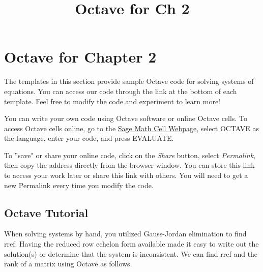 \documentclass{ximera}
\title{Octave for Ch 2} \license{CC BY-NC-SA 4.0}
\begin{document}
\begin{abstract}
\end{abstract}
\maketitle

\section*{Octave for Chapter 2}

The templates in this section provide sample Octave code for solving systems of equations. You can access our code through the link at the bottom of each template.  Feel free to modify the code and experiment to learn more!  

You can write your own code using Octave software or online Octave cells.  To access Octave cells online, go to the \href{https://sagecell.sagemath.org/}{Sage Math Cell Webpage}, select OCTAVE as the language, enter your code, and press EVALUATE.  

To ''save" or share your online code, click on the \emph{Share} button, select \emph{Permalink}, then copy the address directly from the browser window.  You can store this link to access your work later or share this link with others.  You will need to get a new Permalink every time you modify the code.


\subsection*{Octave Tutorial}

When solving systems by hand, you utilized Gauss-Jordan elimination to find rref.  Having the reduced row echelon form available made it easy to write out the solution(s) or determine that the system is inconsistent.  We can find rref and the rank of a matrix using Octave as follows.
\end{document}
